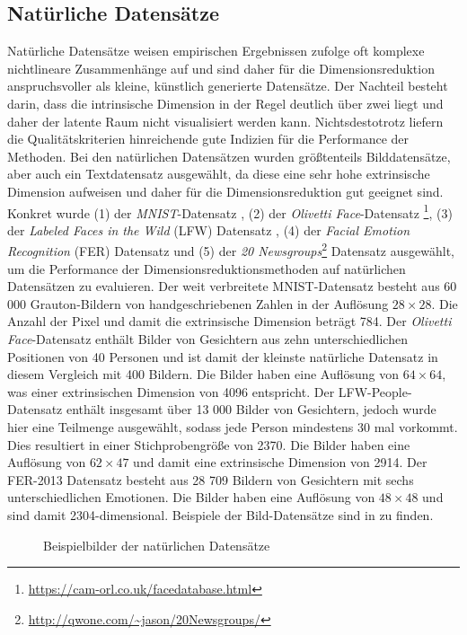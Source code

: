 \subsection{Natürliche Datensätze}
\label{ch:Vergleich:sec:VerwendeteDatensaetze:natuerlich}
Natürliche
Datensätze weisen empirischen Ergebnissen zufolge \addref oft komplexe nichtlineare Zusammenhänge
auf und sind daher für die Dimensionsreduktion anspruchsvoller als kleine, künstlich generierte
Datensätze. Der Nachteil besteht darin, dass die intrinsische Dimension in der Regel deutlich über
zwei liegt und daher der latente Raum nicht visualisiert werden kann. Nichtsdestotrotz liefern die
Qualitätskriterien hinreichende gute Indizien für die Performance der Methoden. Bei den natürlichen
Datensätzen wurden größtenteils Bilddatensätze, aber auch ein Textdatensatz ausgewählt, da diese eine
sehr hohe extrinsische Dimension aufweisen und daher für die Dimensionsreduktion gut geeignet sind.
Konkret wurde (1) der \textit{MNIST}-Datensatz \parencite{LeCun.2010}, (2) der \textit{Olivetti Face}-Datensatz
\footnote{\url{https://cam-orl.co.uk/facedatabase.html}}, (3) der \textit{Labeled Faces in the
	Wild} (LFW) Datensatz \parencite{GaryB.Huang.2007}, (4) der \textit{Facial Emotion Recognition} (FER) Datensatz \parencite{DumitruIanGoodfellowWillCukierskiYoshuaBengio.2013} und (5) der \textit{20
	Newsgroups}\footnote{\url{http://qwone.com/~jason/20Newsgroups/}} Datensatz ausgewählt, um die
Performance der Dimensionsreduktionsmethoden auf natürlichen Datensätzen zu evaluieren. Der weit
verbreitete MNIST-Datensatz besteht aus 60 000 Grauton-Bildern von handgeschriebenen Zahlen in der
Auflösung $28 \times 28$. Die Anzahl der Pixel und damit die extrinsische Dimension beträgt 784.
Der \textit{Olivetti Face}-Datensatz enthält Bilder von Gesichtern aus zehn unterschiedlichen
Positionen von 40 Personen und ist damit der kleinste natürliche Datensatz in diesem Vergleich mit
400 Bildern. Die Bilder haben eine Auflösung von $64 \times 64$, was einer extrinsischen Dimension
von 4096 entspricht. Der LFW-People-Datensatz enthält insgesamt über 13 000 Bilder von Gesichtern,
jedoch wurde hier eine Teilmenge ausgewählt, sodass jede Person mindestens 30 mal vorkommt. Dies
resultiert in einer Stichprobengröße von 2370. Die Bilder haben eine Auflösung von $62 \times 47$
und damit eine extrinsische Dimension von 2914. Der FER-2013 Datensatz besteht aus 28 709 Bildern
von Gesichtern mit sechs unterschiedlichen Emotionen. Die Bilder haben eine Auflösung von $48
	\times 48$ und sind damit 2304-dimensional. Beispiele der Bild-Datensätze sind in
 zu finden.
\begin{figure}
	\label{fig:Dataset_samples}
	\begin{center}
		
	\end{center}
	\caption{Beispielbilder der natürlichen Datensätze}
\end{figure}


